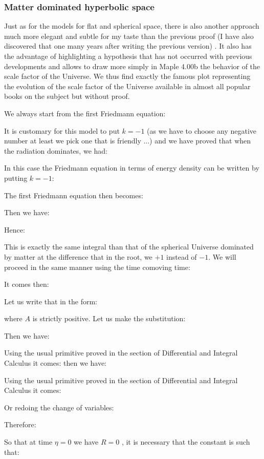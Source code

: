 	\subsubsection{Matter dominated hyperbolic space}
	Just as for the models for flat and spherical space, there is also another approach much more elegant and subtle for my taste than the previous proof (I have also discovered that one many years after writing the previous version) . It also has the advantage of highlighting a hypothesis that has not occurred with previous developments and allows to draw more simply in Maple 4.00b the behavior of the scale factor of the Universe. We thus find exactly the famous plot representing the evolution of the scale factor of the Universe available in almost all popular books on the subject but without proof.

	We always start from the first Friedmann equation:
	
	It is customary for this model to put $k=-1$ (as we have to choose any negative number at least we pick one that is friendly ...) and we have proved that when the radiation dominates, we had:
	
	In this case the Friedmann equation in terms of energy density can be written by putting $k=-1$:
	
	The first Friedmann equation then becomes:
	
	Then we have:
	
	Hence:
	
	This is exactly the same integral than that of the spherical Universe dominated by matter at the difference that in the root, we $+1$ instead of $-1$. We will proceed in the same manner using the time comoving time:
	
	It comes then:
	
	Let us write that in the form:
	
	where $A$ is strictly positive. Let us make the substitution:
	
	Then we have:
	
	Using the usual primitive proved in the section of Differential and Integral Calculus it comes:
	then we have:
	
	Using the usual primitive proved in the section of Differential and Integral Calculus it comes:
	
	Or redoing the change of variables:
	
	Therefore:
	
	So that at time $\eta=0$ we have $R=0$ , it is necessary that the constant is such that:
	
